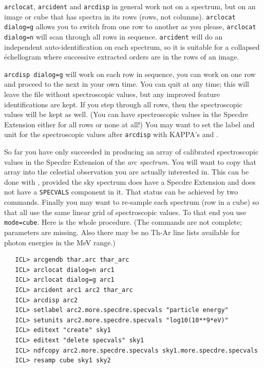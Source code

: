    {\tt arclocat}, {\tt arcident} and {\tt arcdisp} in general work not on
   a spectrum, but on an image or cube that has spectra in its rows
   (rows, not columns). {\tt arclocat dialog=g} allows you to switch
   from one row to another as you please, {\tt arclocat dialog=n} will
   scan through all rows in sequence.  {\tt arcident} will do an
   independent auto-identification on each spectrum, so it is suitable
   for a collapsed \'echellogram where successive extracted orders are in
   the rows of an image.

   {\tt arcdisp dialog=g} will work on each row in sequence, you
   can work on one row and proceed to the next in your own time.  You
   can quit at any time; this will leave the file without spectroscopic
   values, but any improved feature identifications are kept.  If you
   step through all rows, then the spectroscopic values will be
   kept as well. (You can have spectroscopic values in the Specdre
   Extension either for all rows or none at all!)  You may want to set
   the label and unit for the spectroscopic values after {\tt arcdisp}
   with KAPPA's
{\tt{}}
   and
{\tt{}}.

   So far you have only succeeded in producing an array of calibrated
   spectroscopic values in the Specdre Extension of the {\it arc
   spectrum}. You will want to copy that array into the celestial
   observation you are actually interested in.  This can be done with
{\tt{}},
   provided the sky spectrum does have a Specdre Extension and does not
   have a {\tt SPECVALS} component in it.  That status can be achieved
   by two
{\tt{}}
   commands.  Finally you may want to re-sample each spectrum (row in a
   cube) so that all use the same linear grid of spectroscopic
   values. To that end you use
{\tt{} mode=cube}.
   Here is the whole procedure.  (The commands are not complete;
   parameters are missing.  Also there may be no Th-Ar line lists
   available for photon energies in the MeV range.)

\begin{verbatim}
   ICL> arcgendb thar.arc thar_arc
   ICL> arclocat dialog=n arc1
   ICL> arclocat dialog=g arc1
   ICL> arcident arc1 arc2 thar_arc
   ICL> arcdisp arc2
   ICL> setlabel arc2.more.specdre.specvals "particle energy"
   ICL> setunits arc2.more.specdre.specvals "log10(10**9*eV)"
   ICL> editext "create" sky1
   ICL> editext "delete specvals" sky1
   ICL> ndfcopy arc2.more.specdre.specvals sky1.more.specdre.specvals
   ICL> resamp cube sky1 sky2
\end{verbatim}

